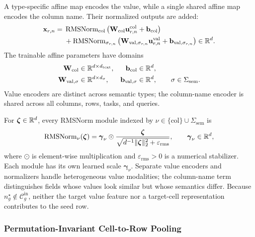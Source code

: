 A type-specific affine map encodes the value, while a single shared affine
map encodes the column name. Their normalized outputs are added:
\begin{equation}
\begin{aligned}
  \mathbf x_{r,n}
  ={}&
  \operatorname{RMSNorm}_{\mathrm{col}}
  \left(
    \mathbf W_{\mathrm{col}}\mathbf u_{r,n}^{\mathrm{col}}
    +\mathbf b_{\mathrm{col}}
  \right)\\
  &+
  \operatorname{RMSNorm}_{\sigma_{r,n}}
  \left(
    \mathbf W_{\mathrm{val},\sigma_{r,n}}
    \mathbf u_{r,n}^{\mathrm{val}}
    +\mathbf b_{\mathrm{val},\sigma_{r,n}}
  \right)
  \in\mathbb{R}^d.
\end{aligned}
\label{eq:method:cell-encoding}
\end{equation}
The trainable affine parameters have domains
\begin{equation}
\begin{aligned}
  \mathbf W_{\mathrm{col}}
  &\in\mathbb{R}^{d\times d_{\mathrm{text}}},
  &
  \mathbf b_{\mathrm{col}}
  &\in\mathbb{R}^d,\\
  \mathbf W_{\mathrm{val},\sigma}
  &\in\mathbb{R}^{d\times d_\sigma},
  &
  \mathbf b_{\mathrm{val},\sigma}
  &\in\mathbb{R}^d,
  \qquad \sigma\in\Sigma_{\mathrm{sem}}.
\end{aligned}
\label{eq:method:cell-parameter-domains}
\end{equation}
Value encoders are distinct across semantic types; the column-name encoder
is shared across all columns, rows, tasks, and queries.

For \(\boldsymbol\zeta\in\mathbb{R}^d\), every RMSNorm module indexed by
\(\nu\in\{\mathrm{col}\}\cup\Sigma_{\mathrm{sem}}\) is
\begin{equation}
  \operatorname{RMSNorm}_\nu(\boldsymbol\zeta)
  =
  \boldsymbol\gamma_\nu\odot
  \frac{\boldsymbol\zeta}{
    \sqrt{d^{-1}\|\boldsymbol\zeta\|_2^2+\varepsilon_{\mathrm{rms}}}
  },
  \qquad
  \boldsymbol\gamma_\nu\in\mathbb{R}^d,
\label{eq:method:rmsnorm}
\end{equation}
where \(\odot\) is element-wise multiplication and
\(\varepsilon_{\mathrm{rms}}>0\) is a numerical stabilizer. Each module has
its own learned scale \(\boldsymbol\gamma_\nu\). Separate value encoders and
normalizers handle heterogeneous value modalities; the column-name term
distinguishes fields whose values look similar but whose semantics differ.
Because \(n_g^\star\notin\mathcal C_g^{\mathrm{in}}\), neither the target
value feature nor a target-cell representation contributes to the seed row.

\subsubsection{Permutation-Invariant Cell-to-Row Pooling}
\label{sec:method:row-pooling}

